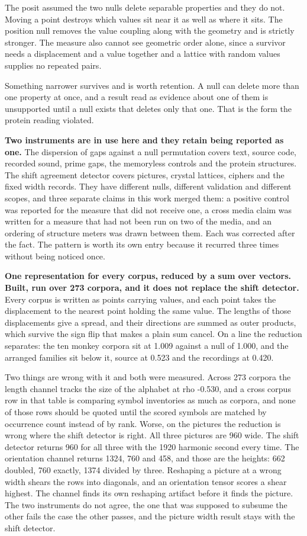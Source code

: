 The posit assumed the two nulls delete separable properties and they do not. Moving a point destroys which values sit near it as well as where it sits. The position null removes the value coupling along with the geometry and is strictly stronger. The measure also cannot see geometric order alone, since a survivor needs a displacement and a value together and a lattice with random values supplies no repeated pairs.

Something narrower survives and is worth retention. A null can delete more than one property at once, and a result read as evidence about one of them is unsupported until a null exists that deletes only that one. That is the form the protein reading violated.

\textbf{Two instruments are in use here and they retain being reported as one.} The dispersion of gaps against a null permutation covers text, source code, recorded sound, prime gaps, the memoryless controls and the protein structures. The shift agreement detector covers pictures, crystal lattices, ciphers and the fixed width records. They have different nulls, different validation and different scopes, and three separate claims in this work merged them: a positive control was reported for the measure that did not receive one, a cross media claim was written for a measure that had not been run on two of the media, and an ordering of structure meters was drawn between them. Each was corrected after the fact. The pattern is worth its own entry because it recurred three times without being noticed once.

\textbf{One representation for every corpus, reduced by a sum over vectors. Built, run over 273 corpora, and it does not replace the shift detector.} Every corpus is written as points carrying values, and each point takes the displacement to the nearest point holding the same value. The lengths of those displacements give a spread, and their directions are summed as outer products, which survive the sign flip that makes a plain sum cancel. On a line the reduction separates: the ten monkey corpora sit at 1.009 against a null of 1.000, and the arranged families sit below it, source at 0.523 and the recordings at 0.420.

Two things are wrong with it and both were measured. Across 273 corpora the length channel tracks the size of the alphabet at rho -0.530, and a cross corpus row in that table is comparing symbol inventories as much as corpora, and none of those rows should be quoted until the scored symbols are matched by occurrence count instead of by rank. Worse, on the pictures the reduction is wrong where the shift detector is right. All three pictures are 960 wide. The shift detector returns 960 for all three with the 1920 harmonic second every time. The orientation channel returns 1324, 760 and 458, and those are the heights: 662 doubled, 760 exactly, 1374 divided by three. Reshaping a picture at a wrong width shears the rows into diagonals, and an orientation tensor scores a shear highest. The channel finds its own reshaping artifact before it finds the picture. The two instruments do not agree, the one that was supposed to subsume the other fails the case the other passes, and the picture width result stays with the shift detector.

